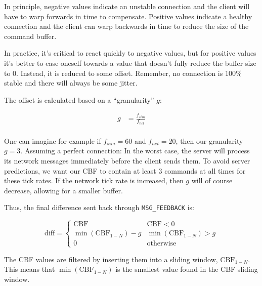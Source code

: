 In principle, negative values indicate an  unstable  connection  and the client
will  have to warp forwards in time to compensate. Positive values  indicate  a
healthy connection and the client can warp backwards in time to reduce the size
of the command buffer.

In  practice,  it's  critical  to  react  quickly  to  negative values, but for
positive values it's  better to ease oneself towards a value that doesn't fully
reduce the buffer size to  0.  Instead, it is reduced to some offset. Remember,
no connection is 100\% stable and there will always be some jitter.

The offset is calculated based on a ``granularity'' $g$:

\begin{align}
    g &= \frac{f_{sim}}{f_{net}} \\
    \label{eq:granularity}
\end{align}

One  can  imagine  for  example  if  $f_{sim}=60$  and  $f_{net}=20$, then  our
granularity $g=3$. Assuming a perfect connection: In the worst case, the server
will process its network messages immediately before the client sends  them. To
avoid server predictions, we want our CBF to contain at least 3 commands at all
times  for  these  tick rates. If the network tick rate is increased, then  $g$
will of course decrease, allowing for a smaller buffer.

Thus, the final difference sent back through \verb$MSG_FEEDBACK$ is:

\begin{equation}
    \text{diff} = \begin{cases}
        \text{CBF} &\text{CBF}<0 \\
        \min\left(\text{CBF}_{1-N}\right) - g & \min\left(\text{CBF}_{1-N}\right) > g \\
        0 & \text{otherwise}
    \end{cases}
\end{equation}

The  CBF  values  are  filtered  by  inserting  them  into  a  sliding  window,
$\text{CBF}_{1-N}$. This means that $\min\left(\text{CBF}_{1-N}\right)$  is the
smallest value found in the CBF sliding window.

\vspace{1.5em}

\begin{figure}[H]

\end{figure}

